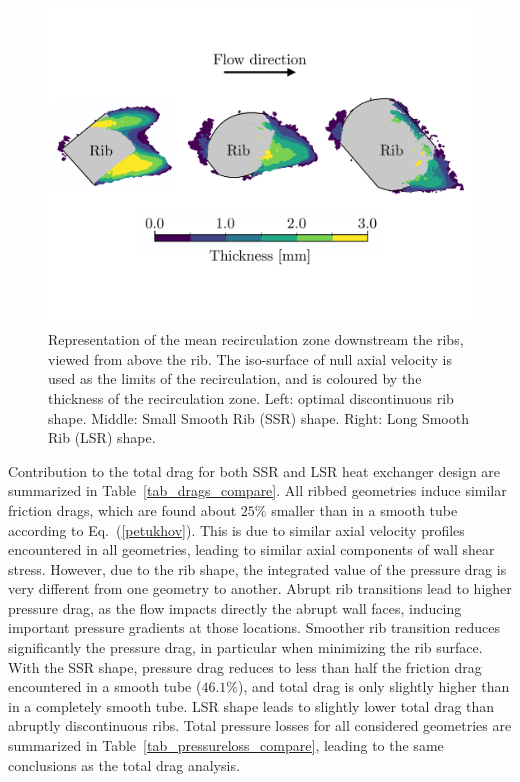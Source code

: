 \begin{figure}[h]
\centering
\includegraphics[width=\linewidth,keepaspectratio]{fig/applications/optim/Recircul_zones2.pdf}
\caption{Representation of the mean recirculation zone downstream the ribs, viewed from above the rib. The iso-surface of null axial velocity is used as the limits of the recirculation, and is coloured by the thickness of the recirculation zone. Left: optimal discontinuous rib shape. Middle: Small Smooth Rib (SSR) shape. Right: Long Smooth Rib (LSR) shape.}
\label{recircul_zones}
\end{figure}

Contribution to the total drag for both SSR and LSR heat exchanger design are summarized in Table~\ref{tab_drags_compare}. All ribbed geometries induce similar friction drags, which are found about $25 \%$ smaller than in a smooth tube according to Eq.~(\ref{petukhov}). This is due to similar axial velocity profiles encountered in all geometries, leading to similar axial components of wall shear stress. However, due to the rib shape, the integrated value of the pressure drag is very different from one geometry to another. Abrupt rib transitions lead to higher pressure drag, as the flow impacts directly the abrupt wall faces, inducing important pressure gradients at those locations. Smoother rib transition reduces significantly the pressure drag, in particular when minimizing the rib surface. With the SSR shape, pressure drag reduces to less than half the friction drag encountered in a smooth tube ($46.1 \%$), and total drag is only slightly higher than in a completely smooth tube. LSR shape leads to slightly lower total drag than abruptly discontinuous ribs. Total pressure losses for all considered geometries are summarized in Table~\ref{tab_pressureloss_compare}, leading to the same conclusions as the total drag analysis.\\


